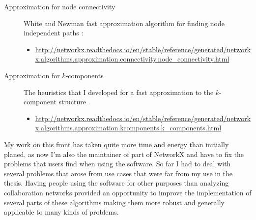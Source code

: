 \begin{description}
\begin{scriptsize}
\begin{itemize}
\end{itemize}
\end{scriptsize}

\item[Approximation for node connectivity] White and Newman fast approximation algorithm for finding node independent paths \citep{white:2001b}:

\begin{scriptsize} 
\begin{itemize} 

\item \href{http://networkx.readthedocs.io/en/stable/reference/generated/networkx.algorithms.approximation.connectivity.node_connectivity.html}{http://networkx.readthedocs.io/en/stable/reference/generated/networkx.algorithms.approximation.connectivity.node\_connectivity.html}

\end{itemize}
\end{scriptsize}

\item[Approximation for $k$-components] The heuristics that I developed for a fast approximation to the $k$-component structure \citep{torrents:2015,torrents:2015b}.

\begin{scriptsize} 
\begin{itemize}

\item \href{http://networkx.readthedocs.io/en/stable/reference/generated/networkx.algorithms.approximation.kcomponents.k_components.html}{http://networkx.readthedocs.io/en/stable/reference/generated/networkx.algorithms.approximation.kcomponents.k\_components.html}

\end{itemize}
\end{scriptsize}

\end{description}

My work on this front has taken quite more time and energy than initially planed, as now I'm also the maintainer of part of NetworkX and have to fix the problems that users find when using the software. So far I had to deal with several problems that arose from use cases that were far from my use in the thesis. Having people using the software for other purposes than analyzing collaboration networks provided an opportunity to improve the implementation of several parts of these algorithms making them more robust and generally applicable to many kinds of problems.

